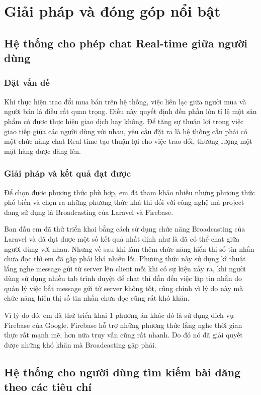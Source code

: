 \documentclass[../DoAn.tex]{subfiles}
\begin{document}
\section{Giải pháp và đóng góp nổi bật}
\subsection{Hệ thống cho phép chat Real-time giữa người dùng}
\subsubsection{Đặt vấn đề}
Khi thực hiện trao đổi mua bán trên hệ thống, việc liên lạc giữa người mua và người bán là điều rất quan trọng. Điều này quyết định đến phần lớn tỉ lệ một sản phẩm có được thực hiện giao dịch hay không. Để tăng sự thuận lợi trong việc giao tiếp giữa các người dùng với nhau, yêu cầu đặt ra là hệ thống cần phải có một chức năng chat Real-time tạo thuận lợi cho việc trao đổi, thương lượng một mặt hàng được đăng lên.
\subsubsection{Giải pháp và kết quả đạt được}
Để chọn được phương thức phù hợp, em đã tham khảo nhiều những phương thức phổ biến và chọn ra những phương thức khả thi đối với công nghệ mà project đang sử dụng là Broadcasting của Laravel và Firebase.

Ban đầu em đã thử triển khai bằng cách sử dụng chức năng Broadcasting của Laravel và đã đạt được một số kết quả nhất định như là đã có thể chat giữa người dùng với nhau. Nhưng về sau khi làm thêm chức năng hiển thị số tin nhắn chưa đọc thì em đã gặp phải khá nhiều lỗi. Phương thức này sử dụng kĩ thuật lắng nghe message gửi từ server lên client mỗi khi có sự kiện xảy ra, khi người dùng sử dụng nhiều tab trình duyệt để chat thì dẫn đến việc lặp tin nhắn do quản lý việc bắt message gửi từ server không tốt, cũng chính vì lý do này mà chức năng hiển thị số tin nhắn chưa đọc cũng rất khó khăn. 

Vì lý do đó, em đã thử triển khai 1 phương án khác đó là sử dụng dịch vụ Firebase của Google. Firebase hỗ trợ những phương thức lắng nghe thời gian thực rất mạnh mẽ, hơn nữa truy vấn cũng rất nhanh. Do đó nó đã giải quyết được những khó khăn mà Broadcasting gặp phải.

\subsection{Hệ thống cho người dùng tìm kiếm bài đăng theo các tiêu chí}
\end{document}
